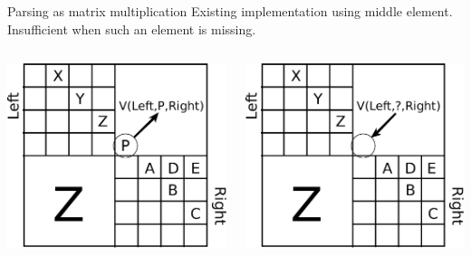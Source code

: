 \documentclass{beamer}
\begin{document}
\begin{frame}{Parsing as matrix multiplication}
    Existing implementation using middle element. Insufficient when such an
    element is missing. \\[.5cm]

    \begin{columns}
        \begin{column}{.4\textwidth}
            \includegraphics[width=\textwidth]{merge-with-element.eps}
        \end{column}
        \begin{column}{.4\textwidth}
            \includegraphics[width=\textwidth]{merge-without-element.eps}
        \end{column}
    \end{columns}
\end{frame}
\end{document}
